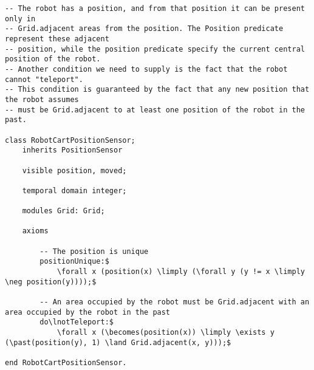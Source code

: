 \begin{lstlisting}[fontadjust, mathescape, frame=single] 
-- The robot has a position, and from that position it can be present only in
-- Grid.adjacent areas from the position. The Position predicate represent these adjacent
-- position, while the position predicate specify the current central position of the robot.
-- Another condition we need to supply is the fact that the robot cannot "teleport".
-- This condition is guaranteed by the fact that any new position that the robot assumes
-- must be Grid.adjacent to at least one position of the robot in the past.

class RobotCartPositionSensor;
    inherits PositionSensor
    
    visible position, moved;
    
    temporal domain integer;

    modules Grid: Grid;
    
    axioms
    
        -- The position is unique
        positionUnique:$ 
            \forall x (position(x) \limply (\forall y (y != x \limply \neg position(y))));$          

        -- An area occupied by the robot must be Grid.adjacent with an area occupied by the robot in the past
        do\lnotTeleport:$
            \forall x (\becomes(position(x)) \limply \exists y (\past(position(y), 1) \land Grid.adjacent(x, y)));$
            
end RobotCartPositionSensor.\end{lstlisting}